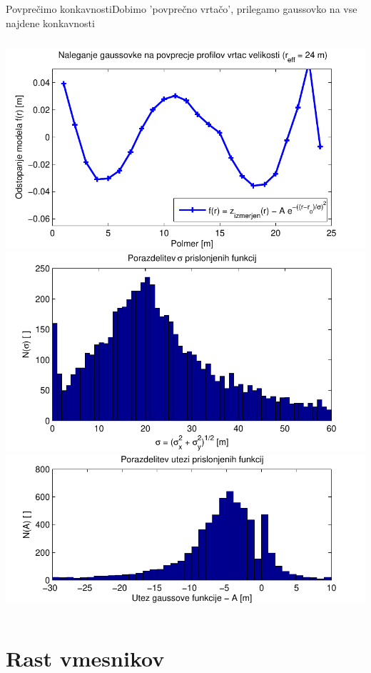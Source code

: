 \documentclass{beamer}
\begin{document}
\begin{frame}{Povprečimo konkavnosti}{Dobimo 'povprečno vrtačo', prilegamo gaussovko na vse najdene konkavnosti}
\begin{columns}
  \begin{column}{0.45\textwidth}
    \includegraphics[width=\textwidth]{slike/menisija-profil-21-fit} \\
    \includegraphics[width=\textwidth]{slike/menisija-sigme-hist} \\
    \includegraphics[width=\textwidth]{slike/menisija-globine-hist}
  \end{column}
\end{columns}

\end{frame}


\section{Rast vmesnikov}
\end{document}
